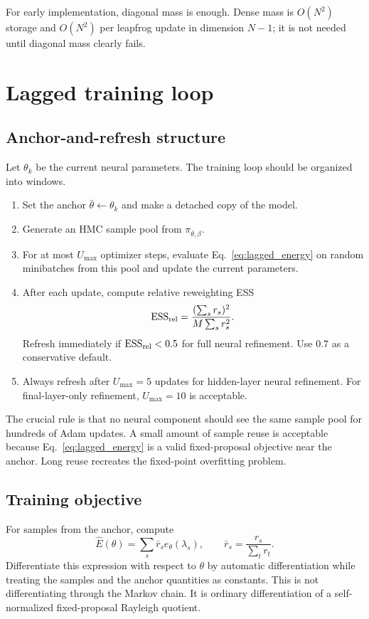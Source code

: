 \documentclass[11pt]{article}
\newcommand{\ess}{\operatorname{ESS}}
\begin{document}
For early implementation, diagonal mass is enough.  Dense mass is $O(N^2)$ storage and $O(N^2)$ per leapfrog update in dimension $N-1$; it is not needed until diagonal mass clearly fails.

\section{Lagged training loop}

\subsection{Anchor-and-refresh structure}

Let $\theta_k$ be the current neural parameters.  The training loop should be organized into windows.
\begin{enumerate}[label=\textbf{Step \arabic*.},leftmargin=*]
\item Set the anchor $\bar\theta\leftarrow\theta_k$ and make a detached copy of the model.
\item Generate an HMC sample pool from $\pi_{\bar\theta,\beta}$.
\item For at most $U_{\max}$ optimizer steps, evaluate Eq.~\eqref{eq:lagged_energy} on random minibatches from this pool and update the current parameters.
\item After each update, compute relative reweighting ESS
\begin{equation}
 \ess_{\rm rel}=\frac{(\sum_s r_s)^2}{M\sum_s r_s^2}.
\end{equation}
Refresh immediately if $\ess_{\rm rel}<0.5$ for full neural refinement.  Use $0.7$ as a conservative default.
\item Always refresh after $U_{\max}=5$ updates for hidden-layer neural refinement.  For final-layer-only refinement, $U_{\max}=10$ is acceptable.
\end{enumerate}

The crucial rule is that no neural component should see the same sample pool for hundreds of Adam updates.  A small amount of sample reuse is acceptable because Eq.~\eqref{eq:lagged_energy} is a valid fixed-proposal objective near the anchor.  Long reuse recreates the fixed-point overfitting problem.

\subsection{Training objective}

For samples from the anchor, compute
\begin{equation}
 \widehat E(\theta)=\sum_s\bar r_s e_\theta(\lambda_s),
 \qquad
 \bar r_s=\frac{r_s}{\sum_t r_t}.
\end{equation}
Differentiate this expression with respect to $\theta$ by automatic differentiation while treating the samples and the anchor quantities as constants.  This is not differentiating through the Markov chain.  It is ordinary differentiation of a self-normalized fixed-proposal Rayleigh quotient.
\end{document}
